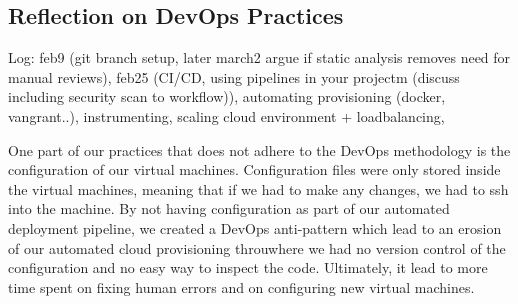 \subsection{Reflection on DevOps Practices}

Log: feb9 (git branch setup, later march2 argue if static analysis removes need for manual reviews), feb25 (CI/CD, using pipelines in your projectm (discuss including security scan to workflow)), automating provisioning (docker, vangrant..),  instrumenting, scaling cloud environment + loadbalancing, 



One part of our practices that does not adhere to the DevOps methodology is the configuration of our virtual machines. 
Configuration files were only stored inside the virtual machines, meaning that if we had to make any changes, we had to ssh into the machine. 
By not having configuration as part of our automated deployment pipeline, we created a DevOps anti-pattern which lead to an erosion of our automated cloud provisioning throuwhere we had no version control of the configuration and no easy way to inspect the code. 
Ultimately, it lead to more time spent on fixing human errors and on configuring new virtual machines.
